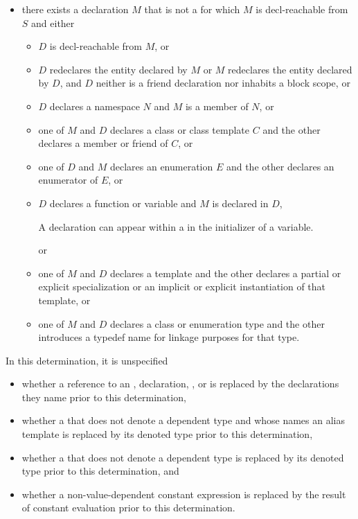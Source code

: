 \begin{itemize}
\item
there exists a declaration $M$ that is not a 
for which $M$ is decl-reachable from $S$ and either
\begin{itemize}
\item
$D$ is decl-reachable from $M$, or
\item
$D$ redeclares the entity declared by $M$ or
$M$ redeclares the entity declared by $D$,
and $D$ neither is a friend declaration
nor inhabits a block scope, or
\item
$D$ declares a namespace $N$ and $M$ is a member of $N$, or
\item
one of $M$ and $D$ declares a class or class template $C$
and the other declares a member or friend of $C$, or
\item
one of $D$ and $M$ declares an enumeration $E$
and the other declares an enumerator of $E$, or
\item
$D$ declares a function or variable and $M$ is declared in $D$,
\begin{footnote}
A declaration can appear within a 
in the initializer of a variable.
\end{footnote}
or
\item
one of $M$ and $D$ declares a template and the other declares
a partial or explicit specialization or
an implicit or explicit instantiation of that template, or
\item
one of $M$ and $D$ declares a class or enumeration type
and the other introduces a typedef name for linkage purposes for that type.
\end{itemize}
\end{itemize}
In this determination, it is unspecified
\begin{itemize}
\item
whether a reference to an
,
 declaration,
, or
is replaced by the declarations they name
prior to this determination,

\item
whether a 
that does not denote a dependent type
and whose  names an alias template
is replaced by its denoted type
prior to this determination,

\item
whether a 
that does not denote a dependent type
is replaced by its denoted type
prior to this determination,
and

\item
whether a non-value-dependent constant expression
is replaced by the result of constant evaluation
prior to this determination.
\end{itemize}

